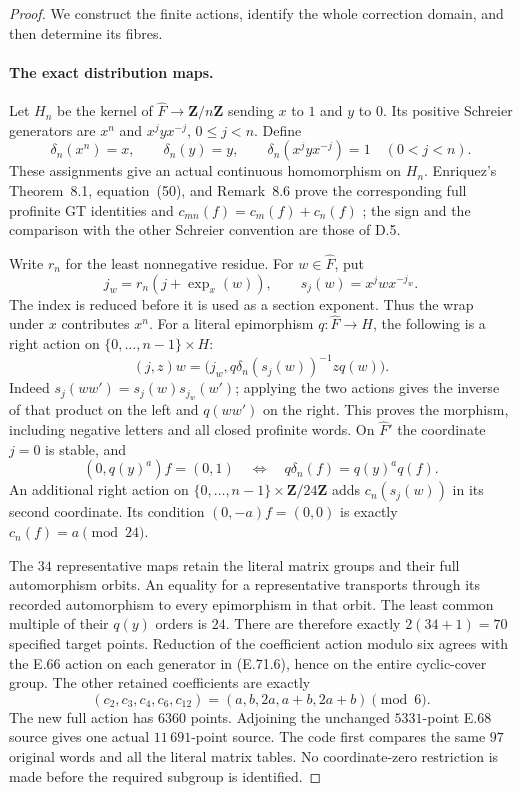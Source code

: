 \begin{proof}
We construct the finite actions, identify the whole
correction domain, and then determine its fibres.

\paragraph{The exact distribution maps.}
Let $H_n$ be the kernel of
$\widehat F\to\mathbf Z/n\mathbf Z$ sending $x$ to
$1$ and $y$ to $0$. Its positive Schreier generators
are $x^n$ and $x^j yx^{-j}$, $0\leq j<n$. Define
\[
 \delta_n(x^n)=x,\qquad \delta_n(y)=y,\qquad
 \delta_n(x^j yx^{-j})=1\quad(0<j<n).
 \tag{E.71.6}
\]
These assignments give an actual continuous
homomorphism on $H_n$. Enriquez's Theorem~8.1,
equation~(50), and Remark~8.6 prove the corresponding
full profinite GT identities and
$c_{mn}(f)=c_m(f)+c_n(f)$
\cite{DE_Enriquez2007}; the sign and the comparison
with the other Schreier convention are those of D.5.

Write $r_n$ for the least nonnegative residue. For
$w\in\widehat F$, put
\[
 j_w=r_n(j+\operatorname{exp}_x(w)),\qquad
 s_j(w)=x^jwx^{-j_w}.
 \tag{E.71.7}
\]
The index is reduced before it is used as a section
exponent. Thus the wrap under $x$ contributes $x^n$.
For a literal epimorphism $q:\widehat F\to H$, the
following is a right action on $\{0,\ldots,n-1\}\times H$:
\[
 (j,z)w=
 \bigl(j_w,q\delta_n(s_j(w))^{-1}zq(w)\bigr).
 \tag{E.71.8}
\]
Indeed
$s_j(ww')=s_j(w)s_{j_w}(w')$; applying the two
actions gives the inverse of that product on the
left and $q(ww')$ on the right. This proves the
morphism, including negative letters and all closed
profinite words. On $\widehat F'$ the coordinate
$j=0$ is stable, and
\[
       (0,q(y)^a)f=(0,1)
       \quad\Longleftrightarrow\quad
       q\delta_n(f)=q(y)^a q(f).
 \tag{E.71.9}
\]
An additional right action on
$\{0,\ldots,n-1\}\times\mathbf Z/24\mathbf Z$
adds $c_n(s_j(w))$ in its second coordinate. Its
condition $(0,-a)f=(0,0)$ is exactly
$c_n(f)=a\pmod{24}$.

The $34$ representative maps retain the literal
matrix groups and their full automorphism orbits.
An equality for a representative transports through
its recorded automorphism to every epimorphism in
that orbit. The least common multiple of their
$q(y)$ orders is $24$. There are therefore exactly
$2(34+1)=70$ specified target points. Reduction of
the coefficient action modulo six agrees with the
E.66 action on each generator in (E.71.6), hence on
the entire cyclic-cover group. The other retained
coefficients are exactly
\[
       (c_2,c_3,c_4,c_6,c_{12})
                 =(a,b,2a,a+b,2a+b)\pmod6.
 \tag{E.71.10}
\]
The new full action has $6360$ points. Adjoining the
unchanged $5331$-point E.68 source gives one actual
$11\,691$-point source. The code first compares the
same $97$ original words and all the literal matrix
tables. No coordinate-zero restriction is made
before the required subgroup is identified.


\end{proof}
